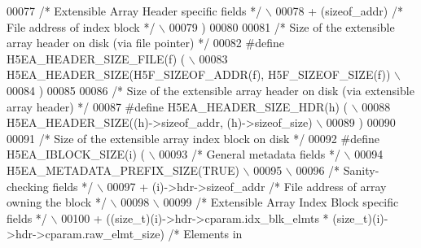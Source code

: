 \begin{DoxyCode}
00077 \textcolor{preprocessor}{    }\textcolor{comment}{/* Extensible Array Header specific fields */}\textcolor{preprocessor}{                             \(\backslash\)}
00078 \textcolor{preprocessor}{    + (sizeof\_addr) }\textcolor{comment}{/* File address of index block */}\textcolor{preprocessor}{                 \(\backslash\)}
00079 \textcolor{preprocessor}{    )}
00080 
00081 \textcolor{comment}{/* Size of the extensible array header on disk (via file pointer) */}
00082 \textcolor{preprocessor}{#define H5EA\_HEADER\_SIZE\_FILE(f)   (                                          \(\backslash\)}
00083 \textcolor{preprocessor}{    H5EA\_HEADER\_SIZE(H5F\_SIZEOF\_ADDR(f), H5F\_SIZEOF\_SIZE(f))                  \(\backslash\)}
00084 \textcolor{preprocessor}{    )}
00085 
00086 \textcolor{comment}{/* Size of the extensible array header on disk (via extensible array header) */}
00087 \textcolor{preprocessor}{#define H5EA\_HEADER\_SIZE\_HDR(h)   (                                           \(\backslash\)}
00088 \textcolor{preprocessor}{    H5EA\_HEADER\_SIZE((h)->sizeof\_addr, (h)->sizeof\_size)                      \(\backslash\)}
00089 \textcolor{preprocessor}{    )}
00090 
00091 \textcolor{comment}{/* Size of the extensible array index block on disk */}
00092 \textcolor{preprocessor}{#define H5EA\_IBLOCK\_SIZE(i)     (                                             \(\backslash\)}
00093 \textcolor{preprocessor}{    }\textcolor{comment}{/* General metadata fields */}\textcolor{preprocessor}{                                             \(\backslash\)}
00094 \textcolor{preprocessor}{    H5EA\_METADATA\_PREFIX\_SIZE(TRUE)                                           \(\backslash\)}
00095 \textcolor{preprocessor}{                                                                              \(\backslash\)}
00096 \textcolor{preprocessor}{    }\textcolor{comment}{/* Sanity-checking fields */}\textcolor{preprocessor}{                                              \(\backslash\)}
00097 \textcolor{preprocessor}{    + (i)->hdr->sizeof\_addr          }\textcolor{comment}{/* File address of array owning the block */}\textcolor{preprocessor}{ \(\backslash\)}
00098 \textcolor{preprocessor}{                                                                              \(\backslash\)}
00099 \textcolor{preprocessor}{    }\textcolor{comment}{/* Extensible Array Index Block specific fields */}\textcolor{preprocessor}{                        \(\backslash\)}
00100 \textcolor{preprocessor}{    + ((size\_t)(i)->hdr->cparam.idx\_blk\_elmts * (size\_t)(i)->hdr->cparam.raw\_elmt\_size) }\textcolor{comment}{/* Elements in
}
\end{DoxyCode}
